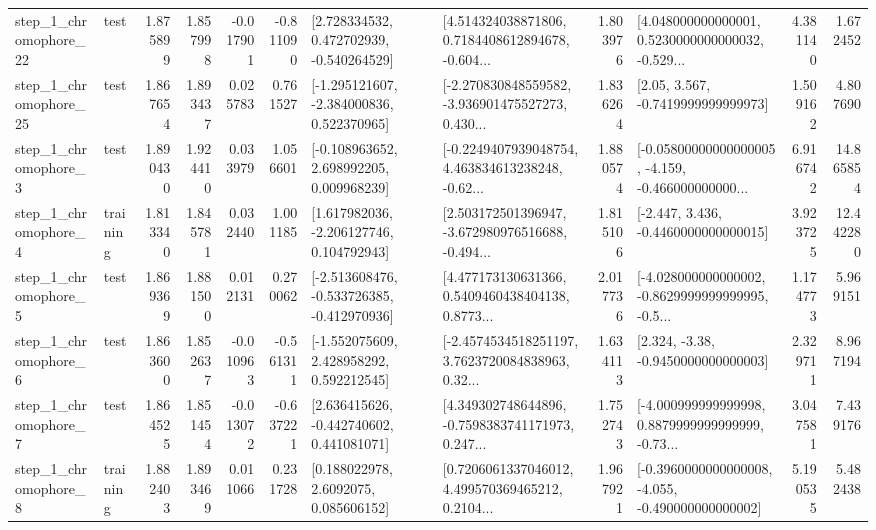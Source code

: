 \begin{tabular}{llrrrrllrlrr}
    step\_1\_chromophore\_22 &      test &      1.875899 &    1.857998 &     -0.017901 & -0.811090 &    [2.728334532, 0.472702939, -0.540264529] &  [4.514324038871806, 0.7184408612894678, -0.604... &       1.803976 &  [4.048000000000001, 0.5230000000000032, -0.529... &            4.381140 &          1.672452 \\
    step\_1\_chromophore\_25 &      test &      1.867654 &    1.893437 &      0.025783 &  0.761527 &   [-1.295121607, -2.384000836, 0.522370965] &  [-2.270830848559582, -3.936901475527273, 0.430... &       1.836264 &                 [2.05, 3.567, -0.7419999999999973] &            1.509162 &          4.807690 \\
     step\_1\_chromophore\_3 &      test &      1.890430 &    1.924410 &      0.033979 &  1.056601 &    [-0.108963652, 2.698992205, 0.009968239] &  [-0.2249407939048754, 4.463834613238248, -0.62... &       1.880574 &  [-0.05800000000000005, -4.159, -0.466000000000... &            6.916742 &         14.865854 \\
     step\_1\_chromophore\_4 &  training &      1.813340 &    1.845781 &      0.032440 &  1.001185 &    [1.617982036, -2.206127746, 0.104792943] &  [2.503172501396947, -3.672980976516688, -0.494... &       1.815106 &               [-2.447, 3.436, -0.4460000000000015] &            3.923725 &         12.442280 \\
     step\_1\_chromophore\_5 &      test &      1.869369 &    1.881500 &      0.012131 &  0.270062 &  [-2.513608476, -0.533726385, -0.412970936] &  [4.477173130631366, 0.5409460438404138, 0.8773... &       2.017736 &  [-4.028000000000002, -0.8629999999999995, -0.5... &            1.174773 &          5.969151 \\
     step\_1\_chromophore\_6 &      test &      1.863600 &    1.852637 &     -0.010963 & -0.561311 &    [-1.552075609, 2.428958292, 0.592212545] &  [-2.4574534518251197, 3.7623720084838963, 0.32... &       1.634113 &                [2.324, -3.38, -0.9450000000000003] &            2.329711 &          8.967194 \\
     step\_1\_chromophore\_7 &      test &      1.864525 &    1.851454 &     -0.013072 & -0.637221 &    [2.636415626, -0.442740602, 0.441081071] &  [4.349302748644896, -0.7598383741171973, 0.247... &       1.752743 &  [-4.000999999999998, 0.8879999999999999, -0.73... &            3.047581 &          7.439176 \\
     step\_1\_chromophore\_8 &  training &      1.882403 &    1.893469 &      0.011066 &  0.231728 &       [0.188022978, 2.6092075, 0.085606152] &  [0.7206061337046012, 4.499570369465212, 0.2104... &       1.967921 &  [-0.3960000000000008, -4.055, -0.490000000000002] &            5.190535 &          5.482438 \\

\end{tabular}

